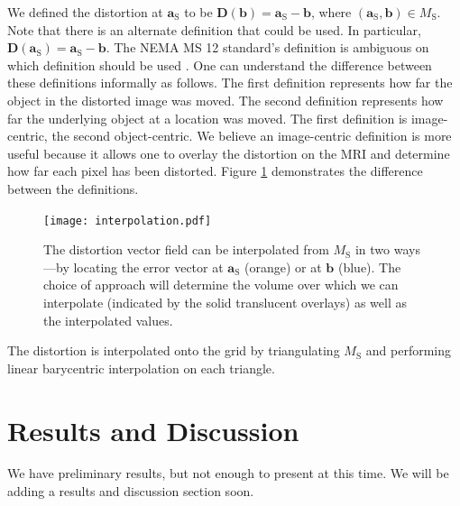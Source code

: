 \documentclass[12pt]{article}
\begin{document}
We defined the distortion at $\mathbf{a}_\textrm{S}$ to be $\mathbf{D}(\mathbf{b}) = \mathbf{a}_\textrm{S} - \mathbf{b}$, where $(\mathbf{a}_\textrm{S}, \mathbf{b}) \in M_\textrm{S}$.  Note that there is an alternate definition that could be used.  In particular, $\mathbf{D}(\mathbf{a}_\textrm{S}) = \mathbf{a}_\textrm{S} - \mathbf{b}$.  The NEMA MS 12 standard's definition is ambiguous on which definition should be used \cite{nema2010}.  One can understand the difference between these definitions informally as follows.  The first definition represents how far the object in the distorted image was moved.  The second definition represents how far the underlying object at a location was moved.  The first definition is image-centric, the second object-centric.  We believe an image-centric definition is more useful because it allows one to overlay the distortion on the MRI and determine how far each pixel has been distorted.  Figure \ref{fig:interpolation} demonstrates the difference between the definitions.

\begin{figure}
    \centering
    \texttt{[image: interpolation.pdf]}
    \caption{The distortion vector field can be interpolated from $M_\textrm{S}$ in two ways---by locating the error vector at $\mathbf{a}_\textrm{S}$ (orange) or at $\mathbf{b}$ (blue).  The choice of approach will determine the volume over which we can interpolate (indicated by the solid translucent overlays) as well as the interpolated values.}
    \label{fig:interpolation}
\end{figure}

The distortion is interpolated onto the grid by triangulating $M_\textrm{S}$ and performing linear barycentric interpolation on each triangle.

\section{Results and Discussion}

We have preliminary results, but not enough to present at this time.  We will be adding a results and discussion section soon.



\end{document}
